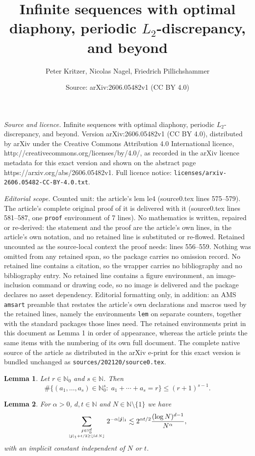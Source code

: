 \documentclass[10pt,a4paper]{amsart}
\title{Infinite sequences with optimal diaphony, periodic $L_2$-discrepancy, and beyond}
\author{Peter Kritzer, Nicolas Nagel, Friedrich Pillichshammer}
\date{Source: arXiv:2606.05482v1 (CC BY 4.0)}
\newtheorem{lem}{Lemma}
\newcommand{\N}{{\mathbb{N}}} %
\newcommand{\bbN}{{\mathbb{N}}}
\newcommand{\bsj}{{\boldsymbol{j}}}
\newcommand{\ld}{{\rm ld}\,}
\begin{document}
\maketitle

\noindent\emph{Source and licence.} Infinite sequences with optimal diaphony, periodic $L_2$-discrepancy, and beyond. Version arXiv:2606.05482v1 (CC BY 4.0), distributed by arXiv under the Creative Commons Attribution 4.0 International licence, http://creativecommons.org/licenses/by/4.0/, as recorded in the arXiv licence metadata for this exact version and shown on the abstract page https://arxiv.org/abs/2606.05482v1. Full licence notice: \texttt{licenses/arxiv-2606.05482-CC-BY-4.0.txt}.\par\smallskip

\noindent\textit{Editorial scope.} Counted unit: the article's lem le4 (source0.tex lines 575--579). The article's complete original proof of it is delivered with it (source0.tex lines 581--587, one \texttt{proof} environment of 7 lines). No mathematics is written, repaired or re-derived: the statement and the proof are the article's own lines, in the article's own notation, and no retained line is substituted or re-flowed.  Retained uncounted as the source-local context the proof needs: lines 556--559.  Nothing was omitted from any retained span, so the package carries no omission record.  No retained line contains a citation, so the wrapper carries no bibliography and no bibliography entry.  No retained line contains a figure environment, an image-inclusion command or drawing code, so no image is delivered and the package declares no asset dependency.  Editorial formatting only, in addition: an AMS \texttt{amsart} preamble that restates the article's own declarations and macros used by the retained lines, namely the environments \texttt{lem} on separate counters, together with the standard packages those lines need.  The retained environments print in this document as Lemma 1 in order of appearance, whereas the article prints the same items with the numbering of its own full document.  The complete native source of the article as distributed in the arXiv e-print for this exact version is bundled unchanged as \texttt{sources/202120/source0.tex}.
\begin{lem}\label{index_dim_red}
Let $r\in\N_0$ and $s\in\N$. Then
\[ \#\{(a_1,\ldots,a_s)\in\N_0^s:\; a_1 + \cdots + a_s = r\} \leq (r + 1)^{s-1}. \]
\end{lem}

\begin{lem}\label{le4}
For $\alpha >0$, $d, t \in \bbN$ and $N \in \bbN \setminus \{1\}$ we have
$$\sum_{\bsj \in \bbN_{0}^d \atop |\bsj|_1+t/2\geq \lfloor\ld N\rfloor} 2^{- \alpha |\bsj|_1} \lesssim  2^{\alpha t/2} \frac{(\log N)^{d-1}}{N^{\alpha}},$$
with an implicit constant independent of $N$ or $t$.
\end{lem}
\end{document}
